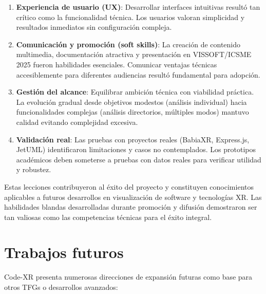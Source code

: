 \documentclass[a4paper, 12pt]{book}
\begin{document}
\begin{enumerate}
  \item \textbf{Experiencia de usuario (UX)}: Desarrollar interfaces intuitivas resultó tan crítico como la funcionalidad técnica. Los usuarios valoran simplicidad y resultados inmediatos sin configuración compleja.
  
  \item \textbf{Comunicación y promoción (soft skills)}: La creación de contenido multimedia, documentación atractiva y presentación en VISSOFT/ICSME 2025 fueron habilidades esenciales. Comunicar ventajas técnicas accesiblemente para diferentes audiencias resultó fundamental para adopción.
  
  \item \textbf{Gestión del alcance}: Equilibrar ambición técnica con viabilidad práctica. La evolución gradual desde objetivos modestos (análisis individual) hacia funcionalidades complejas (análisis directorios, múltiples modos) mantuvo calidad evitando complejidad excesiva.
  
  \item \textbf{Validación real}: Las pruebas con proyectos reales (BabiaXR, Express.js, JetUML) identificaron limitaciones y casos no contemplados. Los prototipos académicos deben someterse a pruebas con datos reales para verificar utilidad y robustez.
\end{enumerate}

Estas lecciones contribuyeron al éxito del proyecto y constituyen conocimientos aplicables a futuros desarrollos en visualización de software y tecnologías XR. Las habilidades blandas desarrolladas durante promoción y difusión demostraron ser tan valiosas como las competencias técnicas para el éxito integral.


\section{Trabajos futuros}
\label{sec:trabajos_futuros}

Code-XR presenta numerosas direcciones de expansión futuras como base para otros TFGs o desarrollos avanzados:
\end{document}
